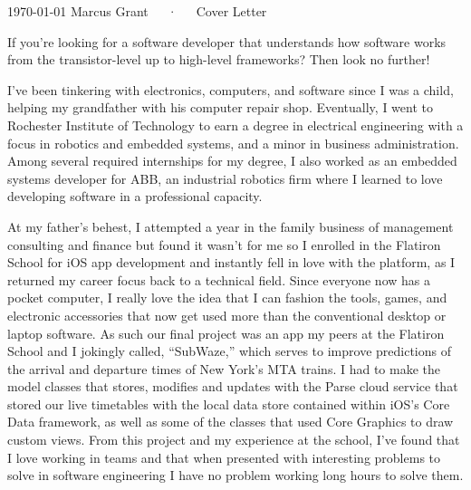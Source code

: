 \documentclass[11pt, letter]{awesome-cv}
\begin{document}
\makecvheader

\makecvfooter
  {\today}
  {Marcus Grant~~~·~~~Cover Letter}
  {}

\makelettertitle

\begin{cvletter}

If you’re looking for a software developer that understands how software works from the transistor-level up to high-level frameworks? Then look no further!

I’ve been tinkering with electronics, computers, and software since I was a child, helping my grandfather with his computer repair shop. Eventually, I went to Rochester Institute of Technology to earn a degree in electrical engineering with a focus in robotics and embedded systems, and a minor in business administration. Among several required internships for my degree, I also worked as an embedded systems developer for ABB, an industrial robotics firm where I learned to love developing software in a professional capacity.

At my father's behest, I attempted a year in the family business of management consulting and finance but found it wasn’t for me so I enrolled in the Flatiron School for iOS app development and instantly fell in love with the platform, as I returned my career focus back to a technical field. Since everyone now has a pocket computer, I really love the idea that I can fashion the tools, games, and electronic accessories that now get used more than the conventional desktop or laptop software. As such our final project was an app my peers at the Flatiron School and I jokingly called, “SubWaze,” which serves to improve predictions of the arrival and departure times of New York’s MTA trains. I had to make the model classes that stores, modifies and updates with the Parse cloud service that stored our live timetables with the local data store contained within iOS’s Core Data framework, as well as some of the classes that used Core Graphics to draw custom views. From this project and my experience at the school, I’ve found that I love working in teams and that when presented with interesting problems to solve in software engineering I have no problem working long hours to solve them.


\end{cvletter}
\end{document}

